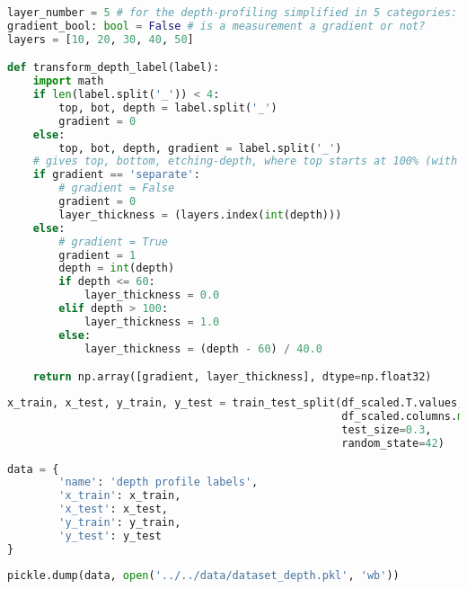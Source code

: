 \begin{lstlisting}[language=Python]
layer_number = 5 # for the depth-profiling simplified in 5 categories: 0-10, 10-20, 20-30, 30-40, 40-50 Angstrom
gradient_bool: bool = False # is a measurement a gradient or not?
layers = [10, 20, 30, 40, 50]

def transform_depth_label(label):
    import math
    if len(label.split('_')) < 4:
        top, bot, depth = label.split('_')
        gradient = 0
    else:
        top, bot, depth, gradient = label.split('_')
    # gives top, bottom, etching-depth, where top starts at 100% (with 0 etching) on the top
    if gradient == 'separate':
        # gradient = False
        gradient = 0
        layer_thickness = (layers.index(int(depth)))
    else:
        # gradient = True
        gradient = 1
        depth = int(depth)
        if depth <= 60:
            layer_thickness = 0.0
        elif depth > 100:
            layer_thickness = 1.0
        else:
            layer_thickness = (depth - 60) / 40.0

    return np.array([gradient, layer_thickness], dtype=np.float32)
\end{lstlisting}

\begin{lstlisting}[language=Python]
x_train, x_test, y_train, y_test = train_test_split(df_scaled.T.values,
                                                    df_scaled.columns.map(lambda x: transform_depth_label(x)), # first part of the filename is the top label
                                                    test_size=0.3,
                                                    random_state=42)
\end{lstlisting}

\begin{lstlisting}[language=Python]
data = {
        'name': 'depth profile labels',
        'x_train': x_train,
        'x_test': x_test,
        'y_train': y_train,
        'y_test': y_test
}
\end{lstlisting}

\begin{lstlisting}[language=Python]
pickle.dump(data, open('../../data/dataset_depth.pkl', 'wb'))
\end{lstlisting}
